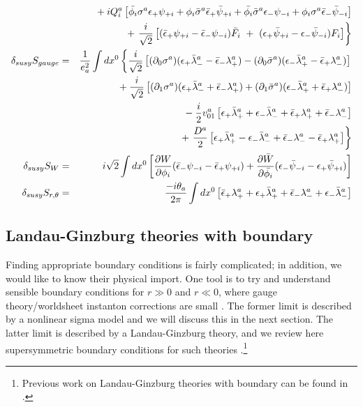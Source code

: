 \documentclass[a4paper,12pt]{article}
\begin{document}
\begin{enumerate}
\begin{eqnarray}
& & \mbox {} + iQ_i^a\left[ \bar{\phi_i}\sigma^a \epsilon_+ \psi_{+i}
+\phi_i\bar{\sigma}^a\bar{\epsilon}_+\bar{\psi}_{+i}+
\bar{\phi_i} \bar{\sigma}^a\epsilon_-\psi_{-i}
+\phi_i\sigma^a\bar{\epsilon}_-\bar{\psi}_{-i}
\right]
\nonumber \\
& & \mbox{} +\left. {i\over\sqrt{2}}\left[(\bar{\epsilon}_+\psi_{+i}-
\bar{\epsilon}_-\psi_{-i})\bar{F}_i~+~(\epsilon_+ \bar{\psi}_{+i}
-\epsilon_- \bar{\psi}_{-i})F_i\right] \right\}\nonumber \\
\delta_{susy} S_{gauge}&=&{1 \over e_a^2}\int dx^0\left\{
{i\over\sqrt{2}}\left[(\partial_0
\sigma^a)(\epsilon_+ \bar{\lambda}_-^a-\bar{\epsilon}_-
\lambda_+^a)-(\partial_0\bar{\sigma}^a)(\epsilon_-\bar{\lambda}_+^a
-\bar{\epsilon}_+\lambda_-^a)\right]\right.\nonumber \\
& & \mbox{}+{ i \over \sqrt{2}} \left[(\partial_1
\sigma^a)(\epsilon_+\bar{\lambda}_-^a+\bar{\epsilon}_-
\lambda_+^a)+(\partial_1 \bar{\sigma}^a)(\epsilon_-\bar{\lambda}_+^a
+\bar{\epsilon}_+\lambda_-^a)\right]\nonumber \\
& & \mbox{}-{i \over 2}v_{01}^a\left[\epsilon_+\bar{\lambda}_+^a
+\epsilon_-\bar{\lambda}_-^a+\bar{\epsilon}_+\lambda_+^a
+\bar{\epsilon}_-\lambda_-^a\right]\nonumber \\
& & \mbox{} + \left. {D^a\over 2}\left[\epsilon_+\bar{\lambda}_+^a-\epsilon_-
\bar{\lambda}_-^a+\bar{\epsilon}_-\lambda_-^a-\bar{\epsilon}_+
\lambda_+^a\right] \right\}\nonumber \\
\delta_{susy} S_W&=&i\sqrt{2}\int dx^0\left[{\partial W\over\partial\phi_i} 
(\bar{\epsilon}_-\psi_{-i}-\bar{\epsilon}_+\psi_{+i})+{\partial\bar {W}
\over\partial\bar{\phi_i}}(\epsilon_-\bar{\psi}_{-i}-\epsilon_+
\bar{\psi}_{+i})\right] \nonumber \\
\delta_{susy} S_{r, \theta}&=&{-i\theta_a\over 2\pi}\int dx^0
\left[\bar{\epsilon}_+\lambda_+^a+\epsilon_+\bar{\lambda}_+^a
+\bar{\epsilon}_-\lambda_-^a+\epsilon_-\bar{\lambda}_-^a\right]
\label{nineteen}
\end{eqnarray}
\end{enumerate}


\subsection{Landau-Ginzburg theories with boundary}

Finding appropriate boundary conditions is fairly
complicated; in addition, we would like to know
their physical import.  One tool is to try and
understand sensible boundary conditions for
$r \gg 0$ and $r \ll 0$, where 
gauge theory/worldsheet instanton corrections
are small \cite{wittenphases,psarev}.  
The former limit is described by a nonlinear sigma model
and we will discuss this in the next section.
The latter limit is described by a Landau-Ginzburg
theory, and we review here supersymmetric
boundary conditions for such theories 
\cite{stt,boundarylg,HIV}.\footnote{Previous work
on Landau-Ginzburg theories with boundary
can be found in \cite{warner}.}
\end{document}

